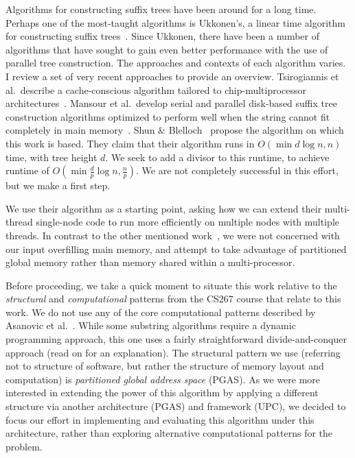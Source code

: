 \documentclass[10pt]{article}
\begin{document}
Algorithms for constructing suffix trees have been around for a long time.
Perhaps one of the most-taught algorithms is Ukkonen's, a linear time algorithm for constructing
suffix trees~\cite{ukkonen_online_1995}.
Since Ukkonen, there have been a number of algorithms that have sought to gain even better
performance with the use of parallel tree construction.
The approaches and contexts of each algorithm varies.
I review a set of very recent approaches to provide an overview.
Tsirogiannis et al.\ describe a cache-conscious algorithm tailored to chip-multiprocessor
architectures~\cite{tsirogiannis_suffix_2010}.
Mansour et al.\ develop serial and parallel disk-based suffix tree construction algorithms
optimized to perform well when the string cannot fit completely in main memory~\cite{mansour_era_2011}.
Shun \& Blelloch~\cite{shun_simple_2014} propose the algorithm on which this work is based.
They claim that their algorithm runs in $O\left(\min{d \log n, n}\right)$ time, 
with tree height $d$.
We seek to add a divisor to this runtime, to achieve runtime of
$O\left(\min{\frac{d}{p} \log n, \frac{n}{p}}\right)$.
We are not completely successful in this effort, but we make a first step.

We use their algorithm as a starting point, asking how we can extend their multi-thread single-node
code to run more efficiently on multiple nodes with multiple threads.
In contrast to the other mentioned work~\cite{tsirogiannis_suffix_2010,mansour_era_2011}, we were
not concerned with our input overfilling main memory, and attempt to take advantage of partitioned
global memory rather than memory shared within a multi-processor.

Before proceeding, we take a quick moment to situate this work relative to the \emph{structural}
and \emph{computational} patterns from the CS267 course that relate to this work.
We do not use any of the core computational patterns described by Asanovic et
al.~\cite{asanovic_view_2009}.
While some substring algorithms require a dynamic programming approach, this one uses a fairly
straightforward divide-and-conquer approach (read on for an explanation).
The structural pattern we use (referring not to structure of software, but rather the structure
of memory layout and computation) is \emph{partitioned global address space} (PGAS).
As we were more interested in extending the power of this algorithm by applying a different
structure via another architecture (PGAS) and framework (UPC), we decided to focus our effort in
implementing and evaluating this algorithm under this architecture, rather than exploring
alternative computational patterns for the problem.
\end{document}
